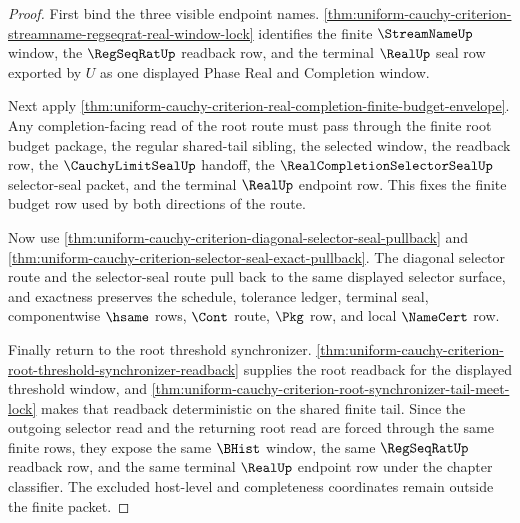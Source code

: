 \begin{proof}
First bind the three visible endpoint names. \autoref{thm:uniform-cauchy-criterion-streamname-regseqrat-real-window-lock} identifies the finite $\StreamNameUp$ window, the $\RegSeqRatUp$ readback row, and the terminal $\RealUp$ seal row exported by $U$ as one displayed Phase Real and Completion window.

Next apply \autoref{thm:uniform-cauchy-criterion-real-completion-finite-budget-envelope}. Any completion-facing read of the root route must pass through the finite root budget package, the regular shared-tail sibling, the selected window, the readback row, the $\CauchyLimitSealUp$ handoff, the $\RealCompletionSelectorSealUp$ selector-seal packet, and the terminal $\RealUp$ endpoint row. This fixes the finite budget row used by both directions of the route.

Now use \autoref{thm:uniform-cauchy-criterion-diagonal-selector-seal-pullback} and \autoref{thm:uniform-cauchy-criterion-selector-seal-exact-pullback}. The diagonal selector route and the selector-seal route pull back to the same displayed selector surface, and exactness preserves the schedule, tolerance ledger, terminal seal, componentwise $\hsame$ rows, $\Cont$ route, $\Pkg$ row, and local $\NameCert$ row.

Finally return to the root threshold synchronizer. \autoref{thm:uniform-cauchy-criterion-root-threshold-synchronizer-readback} supplies the root readback for the displayed threshold window, and \autoref{thm:uniform-cauchy-criterion-root-synchronizer-tail-meet-lock} makes that readback deterministic on the shared finite tail. Since the outgoing selector read and the returning root read are forced through the same finite rows, they expose the same $\BHist$ window, the same $\RegSeqRatUp$ readback row, and the same terminal $\RealUp$ endpoint row under the chapter classifier. The excluded host-level and completeness coordinates remain outside the finite packet.
\end{proof}

